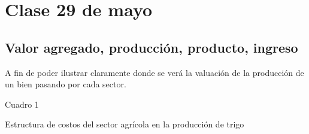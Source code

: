 \section{Clase 29 de mayo}

\subsection{Valor agregado, producción, producto, ingreso}

A fin de poder ilustrar claramente 
donde se verá la valuación de la producción de un bien pasando por cada sector.

Cuadro 1

Estructura de costos del sector agrícola en la producción de trigo

